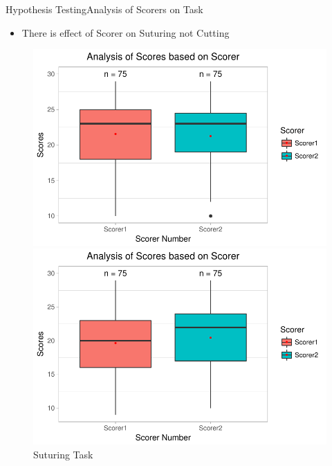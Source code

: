 \documentclass{beamer}
\begin{document}
 \begin{frame}{Hypothesis Testing}{Analysis of Scorers on Task}
\begin{itemize}
  \item {There is effect of Scorer on Suturing not Cutting}
      \end{itemize}
\begin{figure}[!htb]
	\begin{minipage}[c]{0.45\linewidth}
	\includegraphics[width=\linewidth]{Cutting_ScorerVsScore.pdf}
	\caption{Cutting Task}
	\end{minipage}
	\hfill
	\begin{minipage}[c]{0.45\linewidth}
	\includegraphics[width=\linewidth]{Suturing_ScorerVsScore.pdf}
	\caption{Suturing Task}
	\end{minipage}
\end{figure}
 \end{frame}
 
\end{document}
